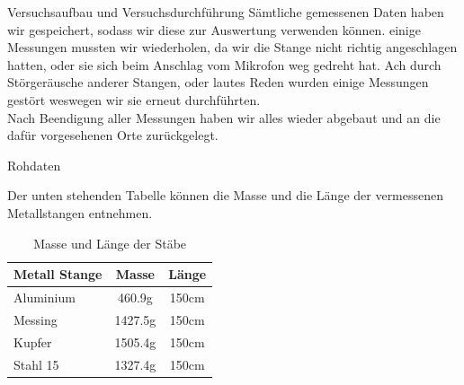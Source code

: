\documentclass[twoside]{protokoll}
\begin{document}
\begin{aufgabe}{Versuchsaufbau und Versuchsdurchführung}
Sämtliche gemessenen Daten haben wir gespeichert, sodass wir diese zur Auswertung verwenden können. einige Messungen mussten wir wiederholen, da wir die Stange nicht richtig angeschlagen hatten, oder sie sich beim Anschlag vom Mikrofon weg gedreht hat. Ach durch Störgeräusche anderer Stangen, oder lautes Reden wurden einige Messungen gestört weswegen wir sie erneut durchführten.\\

Nach Beendigung aller Messungen haben wir alles wieder abgebaut und an die dafür vorgesehenen Orte zurückgelegt. 


\end{aufgabe}

\begin{aufgabe}{Rohdaten}

Der unten stehenden Tabelle können die Masse und die Länge der vermessenen Metallstangen entnehmen. \\
    \begin{table}[H]
        \centering
        \begin{tabularx}{0.8\textwidth}{X c c} %
            \toprule
            \textbf{Metall Stange} & \textbf{Masse} & \textbf{Länge} \\
            \midrule
            Aluminium & 460.9g & 150cm \\
            Messing & 1427.5g & 150cm \\
            Kupfer & 1505.4g & 150cm \\
            Stahl 15 & 1327.4g & 150cm \\
            \bottomrule
        \end{tabularx}
        \caption{Masse und Länge der Stäbe}
        \label{tab:mytable}
    \end{table}


\end{aufgabe}
\end{document}

